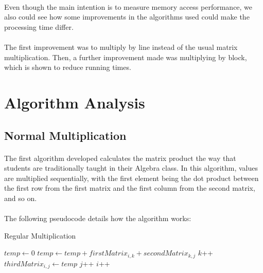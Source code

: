 \documentclass{report}
\begin{document}
    \paragraph{}Even though the main intention is to measure memory access performance, we also could see how some improvements in the algorithms used could make the processing time differ.

    \paragraph{}The first improvement was to multiply by line instead of the usual matrix multiplication. Then, a further improvement made was multiplying by block, which is shown to reduce running times.

    \newpage

    \section*{Algorithm Analysis}

    \subsection*{Normal Multiplication}

    \paragraph{}The first algorithm developed calculates the matrix product the way that students are traditionally taught in their Algebra class. In this algorithm, values are multiplied sequentially, with the first element being the dot product between the first row from the first matrix and the first column from the second matrix, and so on.

    \paragraph{}The following pseudocode details how the algorithm works:

    \begin{algorithm}
      \caption{Regular Multiplication}\label{euclid}
      \begin{algorithmic}[1]
        \State $temp \leftarrow 0$
        \State $temp \leftarrow temp + firstMatrix_{i, k} + secondMatrix_{k, j}$
        \State $k$++
        \EndWhile
        \State $thirdMatrix_{i, j} \leftarrow temp$
        \State $j$++
        \EndWhile
        \State $i$++
        \EndWhile
        \EndProcedure
      \end{algorithmic}
    \end{algorithm}
\end{document}
